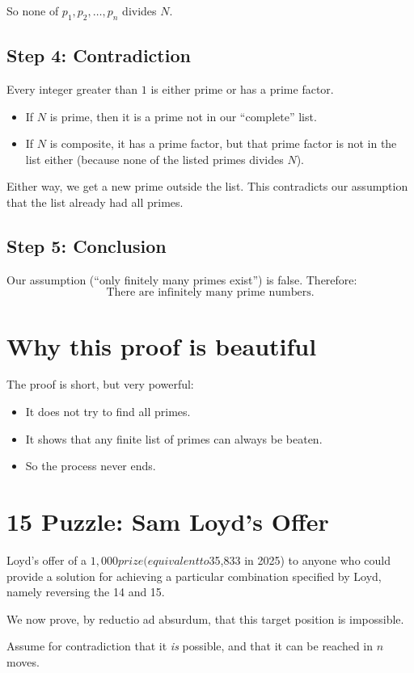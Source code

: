 So none of \(p_1,p_2,\ldots,p_n\) divides \(N\).

\subsection*{Step 4: Contradiction}
Every integer greater than \(1\) is either prime or has a prime factor.
\begin{itemize}
  \item If \(N\) is prime, then it is a prime not in our ``complete'' list.
  \item If \(N\) is composite, it has a prime factor, but that prime factor is
  not in the list either (because none of the listed primes divides \(N\)).
\end{itemize}

Either way, we get a new prime outside the list. This contradicts our assumption
that the list already had all primes.

\subsection*{Step 5: Conclusion}
Our assumption (``only finitely many primes exist'') is false. Therefore:
\[
\text{There are infinitely many prime numbers.}
\]

\section{Why this proof is beautiful}
The proof is short, but very powerful:
\begin{itemize}
  \item It does not try to find all primes.
  \item It shows that any finite list of primes can always be beaten.
  \item So the process never ends.
\end{itemize}

\section{15 Puzzle: Sam Loyd's Offer}
Loyd's offer of a $1,000 prize (equivalent to $35,833 in 2025) to anyone 
who could provide a solution for achieving a particular combination specified by Loyd, 
namely reversing the 14 and 15. 

We now prove, by reductio ad absurdum, that this target position is impossible.

Assume for contradiction that it \emph{is} possible, and that it can be reached
in \(n\) moves.

